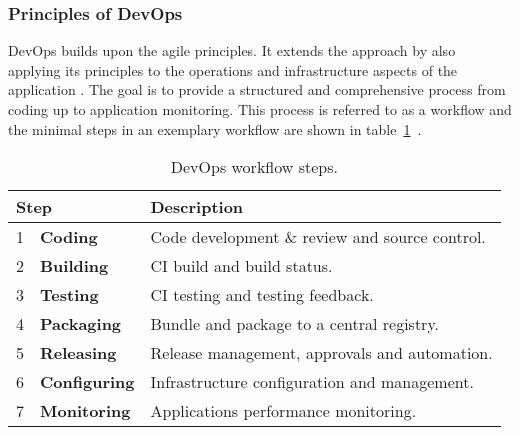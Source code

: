 \documentclass[12pt, a4paper]{article}
\begin{document}
        \subsubsection{Principles of DevOps}\label{ssec::devops_princibles}
        DevOps builds upon the agile principles. It extends the  approach by also applying its principles to the operations and infrastructure aspects of the application \cite{effective_devops}. The goal is to provide a structured and comprehensive process from coding up to application monitoring. This process is referred to as a workflow and the minimal steps in an exemplary workflow are shown in table~\ref{tab::devops_steps}~\cite{base_devops}.\newline
        \begin{table}[!h]
            \centering
            \begin{tabularx}{0.85\textwidth}{llX}
                \multicolumn{2}{l}{Step} & Description \\ \hline\hline
                1 & \textbf{Coding}& Code development \& review and source control.  \\
                2 & \textbf{Building}& \acs{CI} build and build status.  \\
                3 & \textbf{Testing}& \acs{CI} testing and testing feedback.  \\
                4 & \textbf{Packaging}& Bundle and package to a central registry.  \\
                5 & \textbf{Releasing}& Release management, approvals and automation.  \\
                6 & \textbf{Configuring}& Infrastructure configuration and management.  \\
                7 & \textbf{Monitoring}& Applications performance monitoring.  \\
            \end{tabularx}
            \caption{DevOps workflow steps.}
            \label{tab::devops_steps}
        \end{table}
\end{document}
